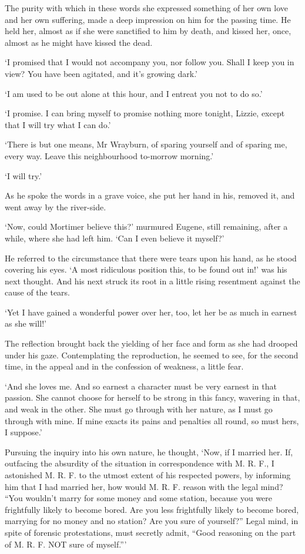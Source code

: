 The purity with which in these words she expressed something of her
own love and her own suffering, made a deep impression on him for the
passing time. He held her, almost as if she were sanctified to him by
death, and kissed her, once, almost as he might have kissed the dead.

‘I promised that I would not accompany you, nor follow you. Shall I keep
you in view? You have been agitated, and it’s growing dark.’

‘I am used to be out alone at this hour, and I entreat you not to do
so.’

‘I promise. I can bring myself to promise nothing more tonight, Lizzie,
except that I will try what I can do.’

‘There is but one means, Mr Wrayburn, of sparing yourself and of sparing
me, every way. Leave this neighbourhood to-morrow morning.’

‘I will try.’

As he spoke the words in a grave voice, she put her hand in his, removed
it, and went away by the river-side.

‘Now, could Mortimer believe this?’ murmured Eugene, still remaining,
after a while, where she had left him. ‘Can I even believe it myself?’

He referred to the circumstance that there were tears upon his hand,
as he stood covering his eyes. ‘A most ridiculous position this, to be
found out in!’ was his next thought. And his next struck its root in a
little rising resentment against the cause of the tears.

‘Yet I have gained a wonderful power over her, too, let her be as much
in earnest as she will!’

The reflection brought back the yielding of her face and form as she
had drooped under his gaze. Contemplating the reproduction, he seemed
to see, for the second time, in the appeal and in the confession of
weakness, a little fear.

‘And she loves me. And so earnest a character must be very earnest in
that passion. She cannot choose for herself to be strong in this fancy,
wavering in that, and weak in the other. She must go through with her
nature, as I must go through with mine. If mine exacts its pains and
penalties all round, so must hers, I suppose.’

Pursuing the inquiry into his own nature, he thought, ‘Now, if I married
her. If, outfacing the absurdity of the situation in correspondence with
M. R. F., I astonished M. R. F. to the utmost extent of his respected
powers, by informing him that I had married her, how would M. R. F.
reason with the legal mind? “You wouldn’t marry for some money and some
station, because you were frightfully likely to become bored. Are you
less frightfully likely to become bored, marrying for no money and no
station? Are you sure of yourself?” Legal mind, in spite of forensic
protestations, must secretly admit, “Good reasoning on the part of M. R.
F. NOT sure of myself.”’

